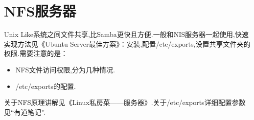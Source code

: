 \section{NFS服务器}
Unix Like系统之间文件共享,比Samba更快且方便.一般和NIS服务器一起使用,快速实现方法见《Ubuntu Server最佳方案》：安装,配置/etc/exports,设置共享文件夹的权限.需要注意的是：
\begin{itemize}
    \item NFS文件访问权限,分为几种情况.

    \item /etc/exports的配置.
\end{itemize}
\par
关于NFS原理讲解见《Linux私房菜——服务器》.关于/etc/exports详细配置参数见“有道笔记”.
